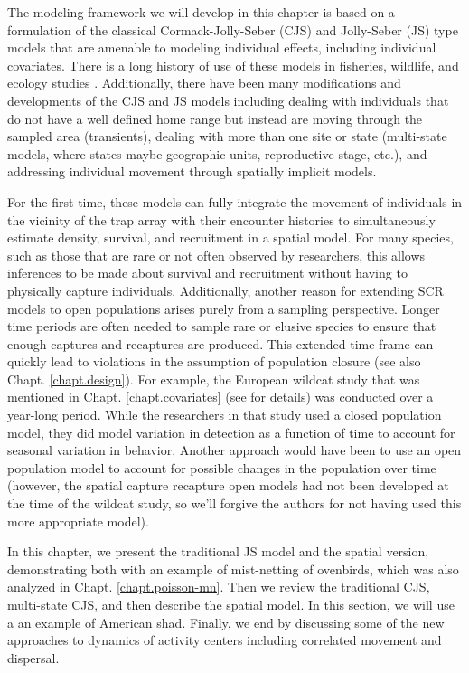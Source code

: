 The modeling framework we will develop in this chapter is based on a
formulation of the classical Cormack-Jolly-Seber (CJS) and Jolly-Seber
(JS) type models \citep{cormack:1964, jolly:1965, seber:1965} that are
amenable to modeling individual effects, including individual
covariates.  There is a long history of use of these models in
fisheries, wildlife, and ecology studies \citep{pollock_etal:1990,
  lebreton_etal:1992, pradel:1996, williams_etal:2002,
  schwarz_arnason:2005, gimenez:2007}.  Additionally, there have been
many modifications and developments of the CJS and JS models including
dealing with individuals that do not have a well defined home range
but instead are moving through the sampled area (transients), dealing
with more than one site or state (multi-state models, where states
maybe geographic units, reproductive stage, etc.), and addressing
individual movement through spatially implicit models.
 
For the first time, these models can fully integrate the movement of
individuals in the vicinity of the trap array with their encounter
histories to simultaneously estimate density, survival, and
recruitment in a spatial model.  For many species, such as those that
are rare or not often observed by researchers, this allows inferences
to be made about survival and recruitment without having to physically
capture individuals.  Additionally, another reason for extending SCR
models to open populations arises purely from a sampling perspective.
Longer time periods are often needed to sample rare or elusive species
to ensure that enough captures and recaptures are produced.  This
extended time frame can quickly lead to violations in the assumption
of population closure (see also Chapt. \ref{chapt.design}).  For
example, the European wildcat study that was mentioned in
Chapt. \ref{chapt.covariates} (see \citet{kery_etal:2011} for details)
was conducted over a year-long period.  While the researchers in that
study used a closed population model, they did model variation in
detection as a function of time to account for seasonal variation in
behavior.  Another approach would have been to use an open population
model to account for possible changes in the population over time
(however, the spatial capture recapture open models had not been
developed at the time of the wildcat study, so we'll forgive the
authors for not having used this more appropriate model).

In this chapter, we present the traditional JS model and the spatial
version, demonstrating both with an example of mist-netting of
ovenbirds, which was also analyzed in Chapt. \ref{chapt.poisson-mn}.
Then we review the traditional CJS, multi-state CJS, and then describe
the spatial model.  In this section, we will use a an example of
American shad.  Finally, we end by discussing some of the new
approaches to dynamics of activity centers including correlated
movement and dispersal.



